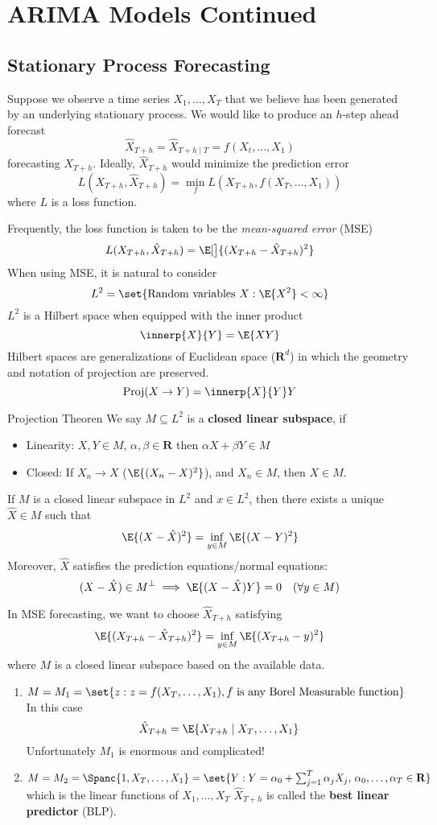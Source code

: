 \chapter{ARIMA Models Continued}
\section{Stationary Process Forecasting}
Suppose we observe a time series
$ X_1,\ldots,X_T $
that we believe has been generated by an underlying
stationary process. We would like to
produce an $ h $-step ahead
forecast
\[ \hat{X}_{T+h}=\hat{X}_{T+h\mid T}=f(X_t,\ldots,X_1) \]
forecasting $ X_{T+h} $. Ideally, $ \hat{X}_{T+h} $
would minimize the prediction error
\[ L(X_{T+h},\hat{X}_{T+h})=\min_f
    L(X_{T+h},f(X_{T},\ldots,X_1)) \]
where $ L $ is a loss function.

Frequently, the loss function is taken
to be the \emph{mean-squared error} (MSE)
\[ L(X_{T+h},\hat{X}_{T+h})=
    \E[\big]{(X_{T+h}-\hat{X}_{T+h})^2} \]
When using MSE, it is natural to consider
\[ L^2=\set{\text{Random variables } X: \E{X^2}<\infty} \]
$ L^2 $ is a Hilbert space when equipped
with the inner product
\[ \innerp{X}{Y}=\E{XY} \]
Hilbert spaces are generalizations of Euclidean space ($ \mathbf{R}^d $)
in which the geometry and notation of projection
are preserved.
\[ \text{Proj}(X\to Y)=\innerp{X}{Y}Y \]
\begin{Theorem}{Projection Theoren}{}
    We say $ M\subseteq L^2 $
    is a \textbf{closed linear subspace}, if
    \begin{itemize}
        \item Linearity: $ X,Y\in M $, $ \alpha,\beta\in\mathbf{R} $
              then $ \alpha X+\beta Y\in M $
        \item Closed: If $ X_n\to X $ ($ \E{(X_n-X)^2} $),
              and $ X_n\in M $, then $ X\in M $.
    \end{itemize}
    If $ M $ is a closed linear subspace in $ L^2 $
    and $ x\in L^2 $, then there exists a
    unique $ \hat{X}\in M $ such that
    \[ \E{(X-\hat{X})^2}=\inf_{y\in M}\E{(X-Y)^2} \]
    Moreover, $ \hat{X} $ satisfies the prediction equations/normal
    equations:
    \[ (X-\hat{X})\in M^\perp \implies \E{(X-\hat{X})Y}=0\quad (\forall y\in M) \]
\end{Theorem}
In MSE forecasting, we want to choose
$ \hat{X}_{T+h} $ satisfying
\[ \E{(X_{T+h}-\hat{X}_{T+h})^2}=\inf_{y\in M}\E{(X_{T+h}-y)^2} \]
where $ M $ is a closed linear subspace based on the available
data.
\begin{enumerate}[(1)]
    \item $ M=M_1=\set{z:z=f(X_{T},\ldots,X_{1}), f\text{ is any
                  Borel Measurable function}} $
          In this case
          \[ \hat{X}_{T+h}=\E{X_{T+h}\mid X_{T},\ldots,X_1} \]
          Unfortunately $ M_1 $ is enormous and complicated!
    \item $ M=M_2=\Spanc{1,X_{T},\ldots,X_1}=
              \set{Y:Y=\alpha_0+\sum_{j=1}^{T} \alpha_j X_j,\,\alpha_0,\ldots,\alpha_T\in\mathbf{R}} $
          which is the linear functions of $ X_1,\ldots,X_T $
          $ \hat{X}_{T+h} $ is called the \textbf{best linear predictor} (BLP).
\end{enumerate}
